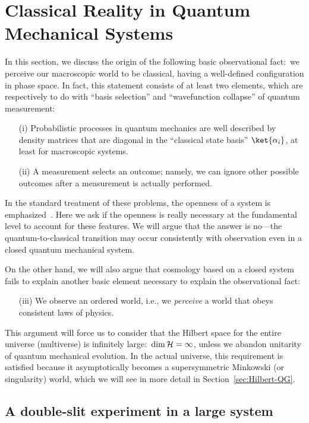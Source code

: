 \documentclass[12pt]{article}
\begin{document}
\section{Classical Reality in Quantum Mechanical Systems}
\label{sec:QM-classical}

In this section, we discuss the origin of the following basic observational 
fact:\ we perceive our macroscopic world to be classical, having a 
well-defined configuration in phase space.  In fact, this statement 
consists of at least two elements, which are respectively to do with 
``basis selection'' and ``wavefunction collapse'' of quantum measurement:
%
\begin{itemize}
%
\item[(i)] Probabilistic processes in quantum mechanics are well described 
by density matrices that are diagonal in the ``classical state basis'' 
$\ket{\alpha_i}$, at least for macroscopic systems.
%
\item[(ii)] A measurement selects an outcome; namely, we can ignore other 
possible outcomes after a measurement is actually performed.
%
\end{itemize}
%
In the standard treatment of these problems, the openness of a system 
is emphasized~\cite{Schlosshauer}.  Here we ask if the openness is really 
necessary at the fundamental level to account for these features.  We 
will argue that the answer is no---the quantum-to-classical transition 
may occur consistently with observation even in a closed quantum 
mechanical system.

On the other hand, we will also argue that cosmology based on a closed 
system fails to explain another basic element necessary to explain the 
observational fact:
%
\begin{itemize}
%
\item[(iii)] We observe an ordered world, i.e., we {\it perceive} a world 
that obeys consistent laws of physics.
%
\end{itemize}
%
This argument will force us to consider that the Hilbert space for the 
entire universe (multiverse) is infinitely large:\ ${\rm dim}\,{\cal H} 
= \infty$, unless we abandon unitarity of quantum mechanical evolution. 
In the actual universe, this requirement is satisfied because it 
asymptotically becomes a supersymmetric Minkowski (or singularity) 
world, which we will see in more detail in Section~\ref{sec:Hilbert-QG}.


\subsection{A double-slit experiment in a large system}
\label{subsec:double-slit}
\end{document}
